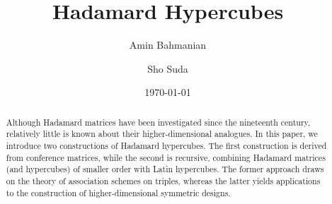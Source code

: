\documentclass[11pt,oneside]{amsart}
\begin{document}
   \author{Amin  Bahmanian}
   \address{Department of Mathematics,
  Illinois State University, Normal, IL USA 61790-4520}
   \author{Sho  Suda}
   \address{Department of Mathematics, National Defense Academy of Japan, 239-8686 Japan}

\title[Hadamard Hypercubes]{Hadamard Hypercubes}

   \begin{abstract}  
Although Hadamard matrices have been investigated since the nineteenth century, relatively little is known about their higher-dimensional analogues.  In this paper, we introduce two constructions of Hadamard hypercubes. The first construction is derived from conference matrices, while the second is recursive, combining Hadamard matrices (and hypercubes) of smaller order with Latin hypercubes. The former approach draws on the theory of association schemes on triples, whereas the latter yields applications to the construction of higher-dimensional symmetric designs.   
   \end{abstract}


   \date{\today}

   \maketitle   
\end{document}
